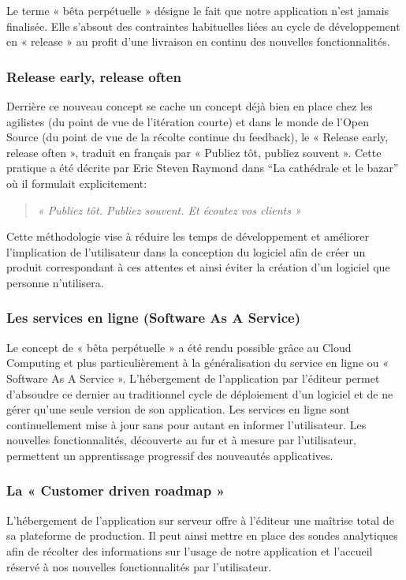 \documentclass{report}
\begin{document}
      Le terme « bêta perpétuelle » désigne le fait que notre application n’est jamais finalisée. Elle s’absout des contraintes habituelles liées au cycle de développement en « release » au profit d’une livraison en continu des nouvelles fonctionnalités.

        \subsubsection{Release early, release often}
        Derrière ce nouveau concept se cache un concept déjà bien en place chez les agilistes (du point de vue de l’itération courte) et dans le monde de l’Open Source (du point de vue de la récolte continue du feedback), le « Release early, release often », traduit en français par « Publiez tôt, publiez souvent ». Cette pratique a été décrite par Eric Steven Raymond dans “La cathédrale et le bazar” où il formulait explicitement:\\
        \begin{quotation}
          \emph{« Publiez tôt. Publiez souvent. Et écoutez vos clients »}\\
        \end{quotation}

        Cette méthodologie vise à réduire les temps de développement et améliorer l’implication de l’utilisateur dans la conception du logiciel afin de créer un produit correspondant à ces attentes et ainsi éviter la création d’un logiciel que personne n’utilisera.

        \subsubsection{Les services en ligne (Software As A Service)}
        Le concept de « bêta perpétuelle » a été rendu possible grâce au Cloud Computing et plus particulièrement à la généralisation du service en ligne ou « Software As A Service ». L’hébergement de l’application par l’éditeur permet d’absoudre ce dernier au traditionnel cycle de déploiement d’un logiciel et de ne gérer qu’une seule version de son application. Les services en ligne sont continuellement mise à jour sans pour autant en informer l’utilisateur. Les nouvelles fonctionnalités, découverte au fur et à mesure par l’utilisateur, permettent un apprentissage progressif des nouveautés applicatives.

        \subsubsection{La « Customer driven roadmap »}
        L’hébergement de l’application sur serveur offre à l’éditeur une maîtrise total de sa plateforme de production. Il peut ainsi mettre en place des sondes analytiques afin de récolter des informations sur l’usage de notre application et l’accueil réservé à nos nouvelles fonctionnalités par l’utilisateur.
\end{document}
